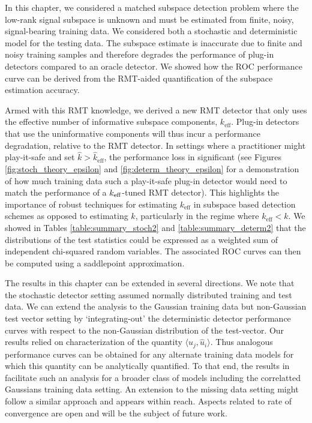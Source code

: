 In this chapter, we considered a matched subspace detection problem where the low-rank signal subspace is unknown and must be estimated from finite, noisy, signal-bearing training data. We considered both a stochastic and deterministic model for the testing data. The subspace estimate is inaccurate due to finite and noisy training samples and therefore degrades the performance of plug-in detectors compared to an oracle detector. We showed how the ROC performance curve can be derived from the RMT-aided quantification of the subspace estimation accuracy.

Armed with this RMT knowledge, we derived a new RMT detector that only uses the effective number of informative subspace components, $k_\text{eff}$. Plug-in detectors that use the uninformative components will thus incur a performance degradation, relative to the RMT detector. In settings where a practitioner might play-it-safe and set $\widehat{k}> \widehat{k}_{\text{eff}}$, the performance loss in significant (see Figures \ref{fig:stoch_theory_epsilon} and \ref{fig:determ_theory_epsilon} for a demonstration of how much training data such a play-it-safe plug-in detector would need to match the performance of a $k_\text{eff}$-tuned RMT detector). This highlights the importance of robust techniques \cite{nadakuditi2010fundamental,johnstone2001distribution,el2007tracy} for estimating $k_\text{eff}$ in subspace based detection schemes as opposed to estimating $k$, particularly in the regime where $k_{\text{eff}} < k$.  We showed in Tables \ref{table:summary_stoch2} and \ref{table:summary_determ2} that the distributions of the test statistics could be expressed as a weighted sum of independent chi-squared random variables. The associated ROC curves can then be computed using a saddlepoint approximation.

The results in this chapter can be extended in several directions. We note that the stochastic detector setting assumed normally distributed training and test data. We can extend the analysis to the Gaussian training data but non-Gaussian test vector setting by `integrating-out' the deterministic detector performance curves with respect to the non-Gaussian distribution of the test-vector. Our results relied on characterization of the quantity $\langle u_{j},\widehat{u}_{i}\rangle$.  Thus analogous performance curves can be obtained for any alternate training data models for which this quantity can be analytically quantified. To that end, the results in \cite{benaych2011singular} facilitate such an analysis for a broader class of models including the correlatted Gaussians training data setting. An extension to the missing data setting might follow a similar approach and appears within reach. Aspects related to rate of convergence are open and will be the subject of future work.